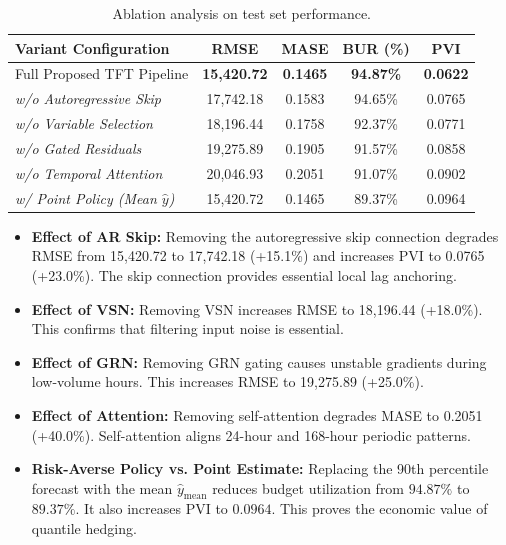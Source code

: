 \documentclass[sigconf]{acmart}
\begin{document}
\begin{table}[htbp]
\centering
\caption{Ablation analysis on test set performance.}
\label{tab:ablation}
\small
\setlength{\tabcolsep}{3.5pt}
\begin{tabular}{lcccc}
\toprule
\textbf{Variant Configuration} & \textbf{RMSE} & \textbf{MASE} & \textbf{BUR (\%)} & \textbf{PVI} \\
\midrule
Full Proposed TFT Pipeline & \textbf{15,420.72} & \textbf{0.1465} & \textbf{94.87\%} & \textbf{0.0622} \\
\quad \emph{w/o Autoregressive Skip} & 17,742.18 & 0.1583 & 94.65\% & 0.0765 \\
\quad \emph{w/o Variable Selection} & 18,196.44 & 0.1758 & 92.37\% & 0.0771 \\
\quad \emph{w/o Gated Residuals} & 19,275.89 & 0.1905 & 91.57\% & 0.0858 \\
\quad \emph{w/o Temporal Attention} & 20,046.93 & 0.2051 & 91.07\% & 0.0902 \\
\quad \emph{w/ Point Policy (Mean $\hat{y}$)} & 15,420.72 & 0.1465 & 89.37\% & 0.0964 \\
\bottomrule
\end{tabular}
\end{table}

\begin{itemize}
    \item \textbf{Effect of AR Skip:} Removing the autoregressive skip connection degrades RMSE from 15,420.72 to 17,742.18 (+15.1\%) and increases PVI to 0.0765 (+23.0\%). The skip connection provides essential local lag anchoring.
    \item \textbf{Effect of VSN:} Removing VSN increases RMSE to 18,196.44 (+18.0\%). This confirms that filtering input noise is essential.
    \item \textbf{Effect of GRN:} Removing GRN gating causes unstable gradients during low-volume hours. This increases RMSE to 19,275.89 (+25.0\%).
    \item \textbf{Effect of Attention:} Removing self-attention degrades MASE to 0.2051 (+40.0\%). Self-attention aligns 24-hour and 168-hour periodic patterns.
    \item \textbf{Risk-Averse Policy vs. Point Estimate:} Replacing the 90th percentile forecast with the mean $\hat{y}_{\text{mean}}$ reduces budget utilization from $94.87\%$ to $89.37\%$. It also increases PVI to $0.0964$. This proves the economic value of quantile hedging.
\end{itemize}
\end{document}
